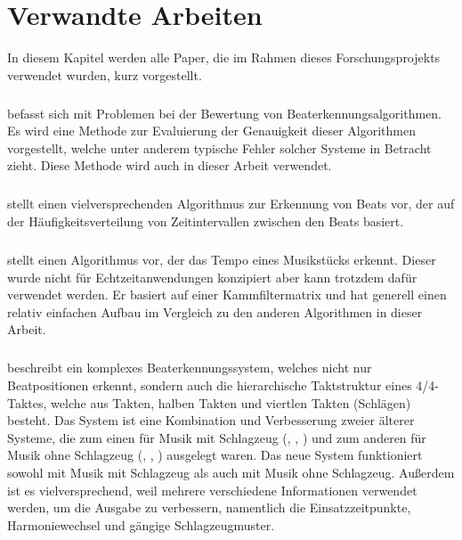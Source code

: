 \chapter{Verwandte Arbeiten}
\label{verwandte_arbeiten}
\acresetall

In diesem Kapitel werden alle Paper,
	die im Rahmen dieses Forschungsprojekts verwendet wurden,
	kurz vorgestellt.

\paragraph{\cite{1997_GoMu1}}
{
	befasst sich mit Problemen bei der Bewertung von Beaterkennungsalgorithmen.
	Es wird eine Methode zur Evaluierung der Genauigkeit dieser Algorithmen vorgestellt,
		welche unter anderem typische Fehler solcher Systeme in Betracht zieht.
	Diese Methode wird auch in dieser Arbeit verwendet.
}


\paragraph{\cite{2000_Di}}
{
	stellt einen vielversprechenden Algorithmus zur Erkennung von Beats vor,
		der auf der Häufigkeitsverteilung von Zeitintervallen zwischen den Beats basiert.
}

\paragraph{\cite{2001_BeatThis}}
{
	stellt einen Algorithmus vor,
		der das Tempo eines Musikstücks erkennt.
	Dieser wurde nicht für Echtzeitanwendungen konzipiert
		aber kann trotzdem dafür verwendet werden.
	Er basiert auf einer Kammfiltermatrix
		und hat generell einen relativ einfachen Aufbau im Vergleich zu den anderen Algorithmen in dieser Arbeit.
}

\paragraph{\cite{2001_Go}}
{
	beschreibt ein komplexes Beaterkennungssystem,
		welches nicht nur Beatpositionen erkennt,
		sondern auch die hierarchische Taktstruktur eines 4/4-Taktes,
		welche aus Takten, halben Takten und viertlen Takten (Schlägen) besteht.
	Das System ist eine Kombination und Verbesserung zweier älterer Systeme,
		die zum einen für Musik mit Schlagzeug (\cite{1994_GoMu}, \cite{1995_GoMu1}, \cite{1998_GoMu})
		und zum anderen für Musik ohne Schlagzeug (\cite{1996_GoMu}, \cite{1997_GoMu2}, \cite{1999_GoMu})
		ausgelegt waren.
	Das neue System funktioniert sowohl mit Musik mit Schlagzeug als auch mit Musik ohne Schlagzeug.
	Au{\ss}erdem ist es vielversprechend,
		weil mehrere verschiedene Informationen verwendet werden,
		um die Ausgabe zu verbessern,
		namentlich die Einsatzzeitpunkte, Harmoniewechsel und gängige Schlagzeugmuster.
}

